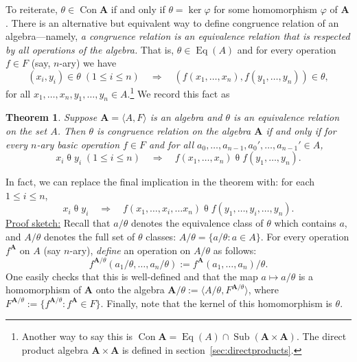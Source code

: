 \documentclass[12pt]{article}
\theoremstyle{plain}
\newtheorem{theorem} {Theorem}
\theoremstyle{definition}
\theoremstyle{remark}
\theoremstyle{remark}
\numberwithin{theorem}{section}
\numberwithin{equation}{section}
\newcommand{\<}{\ensuremath{\langle}}
\renewcommand{\>}{\ensuremath{\rangle}}
\newcommand{\rel}[1]{\ensuremath{\mathbin{#1}}}
\renewcommand{\leq}{\ensuremath{\leqslant}}
\newcommand{\algebra}[1]{\ensuremath{\langle #1 \rangle}}
\newcommand{\Con}{\ensuremath{\operatorname{Con}}}
\newcommand{\Sub}{\ensuremath{\operatorname{Sub}}}     %
\newcommand{\Eq}{\ensuremath{\operatorname{Eq}}}
\newcommand{\bA}{\ensuremath{\mathbf{A}}}
\begin{document}
To reiterate, $\theta \in \Con \bA$ if and only if $\theta = \ker \varphi$ for some 
homomorphism $\varphi$ of $\bA$.  There is an alternative but equivalent way to
define congruence relation of an algebra---namely, \emph{a congruence relation
is an equivalence relation that is respected by all operations of the algebra.}
That is, $\theta \in \Eq(A)$ and for every operation $f\in F$ 
(say, $n$-ary) we have
\begin{equation}
\label{eq:cong-re}
(x_i, y_i) \in \theta \; (1\leq i \leq n) \quad \Longrightarrow \quad 
(f(x_1, \dots, x_{n}), f(y_1, \dots, y_{n})) \in \theta,
\end{equation}
for all $x_1, \dots, x_{n}, y_1, \dots, y_{n} \in A$.\footnote{Another way to
  say this is $\Con \bA = \Eq(A) \cap \Sub(\bA\times \bA)$.
The direct product algebra $\bA \times \bA$ is defined in section~\ref{sec:directproducts}.}
We record this fact as
\begin{theorem}
  \label{thm:cong-rel}
  Suppose $\bA = \algebra{A, F}$ is an algebra and $\theta$ is an equivalence
  relation on the set $A$.  Then $\theta$ is congruence relation on the algebra
  $\bA$ if and only if %
  for every $n$-ary basic operation $f\in F$  and for all
  $a_0, \dots, a_{n-1}, a_0', \dots, a_{n-1}' \in A$,
  \[
  x_i \rel{\theta} y_i \; (1\leq i \leq n) \quad \Longrightarrow \quad 
  f(x_1, \dots, x_{n}) \rel{\theta} f(y_1, \dots, y_{n}).
  \]
\end{theorem}
  In fact, we can replace the final implication in the theorem with: for each $1
  \leq i \leq n$,
  \[
  x_i\rel{\theta} y_i   \quad \Longrightarrow \quad 
  f(x_1, \dots, x_i, \dots x_{n})\rel{\theta} f(y_1, \dots,
  y_i, \dots, y_{n}).
  \]
  \underline{Proof sketch:} Recall that $a/\theta$ denotes the equivalence class of
  $\theta$ which contains $a$, and $A/\theta$ denotes the full set of $\theta$
  classes: $A/\theta= \{a/\theta : a\in A\}$.  For every
  operation $f^\bA$ on $A$ (say $n$-ary), \emph{define} an operation on
  $A/\theta$ as follows:
  \[
  f^{\bA/\theta}(a_1/\theta, \dots, a_n/\theta) := f^\bA(a_1, \dots, a_n)/\theta. 
  \]
  One easily checks that this is well-defined and that the map 
  $a \mapsto a/\theta$ is a homomorphism of $\bA$ onto the algebra 
  $\bA/\theta := \<A/\theta, F^{\bA/\theta}\>$, where 
  $F^{\bA/\theta} := \{f^{\bA/\theta} : f^\bA \in F\}$.  Finally, note that the
  kernel of this homomorphism is $\theta$.
\end{document}
